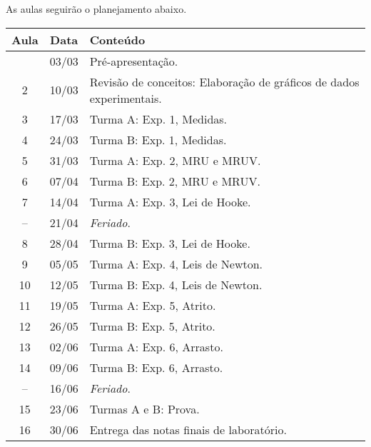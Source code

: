 As aulas seguirão o planejamento abaixo.
\begin{center}
\begin{longtable}{ccp{70mm}}
\toprule
Aula & Data & Conteúdo \\
\midrule
\endhead
\bottomrule
\endfoot
 1 & 03/03 & Pré-apresentação. \\
 2 & 10/03 & Revisão de conceitos: Elaboração de gráficos de dados experimentais. \\
 3 & 17/03 & Turma A: Exp. 1, Medidas. \\
 4 & 24/03 & Turma B: Exp. 1, Medidas. \\ 
 5 & 31/03 & Turma A: Exp. 2, MRU e MRUV. \\
 6 & 07/04 & Turma B: Exp. 2, MRU e MRUV. \\
 7 & 14/04 & Turma A: Exp. 3, Lei de Hooke. \\
-- & 21/04 & \emph{Feriado}. \\
 8 & 28/04 & Turma B: Exp. 3, Lei de Hooke. \\
 9 & 05/05 & Turma A: Exp. 4, Leis de Newton. \\
10 & 12/05 & Turma B: Exp. 4, Leis de Newton. \\
11 & 19/05 & Turma A: Exp. 5, Atrito. \\
12 & 26/05 & Turma B: Exp. 5, Atrito. \\
13 & 02/06 & Turma A: Exp. 6, Arrasto. \\
14 & 09/06 & Turma B: Exp. 6, Arrasto. \\
-- & 16/06 & \emph{Feriado}.\\
15 & 23/06 & Turmas A e B: Prova. \\
16 & 30/06 & Entrega das notas finais de laboratório.
\end{longtable}
\end{center}

\cleardoublepage

